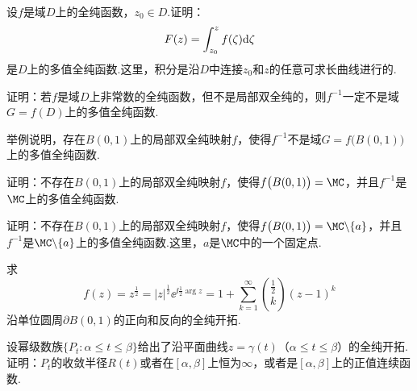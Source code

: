 \begin{xiti}\hypertarget{xiti6.3}{}
\item 设$f$是域$D$上的全纯函数，$z_0\in D$.证明：
\[F(z)=\int_{z_0}^zf(\zeta)\textrm d\zeta\]
是$D$上的多值全纯函数.这里，积分是沿$D$中连接$z_0$和$z$的任意可求长曲线进行的.
\item 证明：若$f$是域$D$上非常数的全纯函数，但不是局部双全纯的，则$f^{-1}$一定不是域$G=f(D)$上的多值全纯函数.
\item \hypertarget{xiti6.3.3}{} 举例说明，存在$B(0,1)$上的局部双全纯映射$f$，使得$f^{-1}$不是域$G=f\big(B(0,1)\big)$上的多值全纯函数.
\item \hypertarget{xiti6.3.4}{} 证明：不存在$B(0,1)$上的局部双全纯映射$f$，使得$f\big(B(0,1)\big)=\MC$，并且$f^{-1}$是$\MC$上的多值全纯函数.
\item 证明：不存在$B(0,1)$上的局部双全纯映射$f$，使得$f\big(B(0,1)\big)=\MC\backslash\{a\}$，并且$f^{-1}$是$\MC\backslash\{a\}$上的多值全纯函数.这里，$a$是$\MC$中的一个固定点.
\item 求
\[f(z)=z^{\frac12}=|z|^{\frac12}\ee^{\ii\frac12\arg z}=1+\sum_{k=1}^\infty
\binom{\frac12}{k}(z-1)^k\]
沿单位圆周$\partial B(0,1)$的正向和反向的全纯开拓.
\item 设幂级数族$\{P_t:\alpha\le t\le\beta\}$给出了沿平面曲线$z=\gamma(t)$（$\alpha\le t\le\beta$）的全纯开拓.证明：$P_t$的收敛半径$R(t)$或者在$[\alpha,\beta]$上恒为$\infty$，或者是$[\alpha,\beta]$上的正值连续函数.
\end{xiti} 
